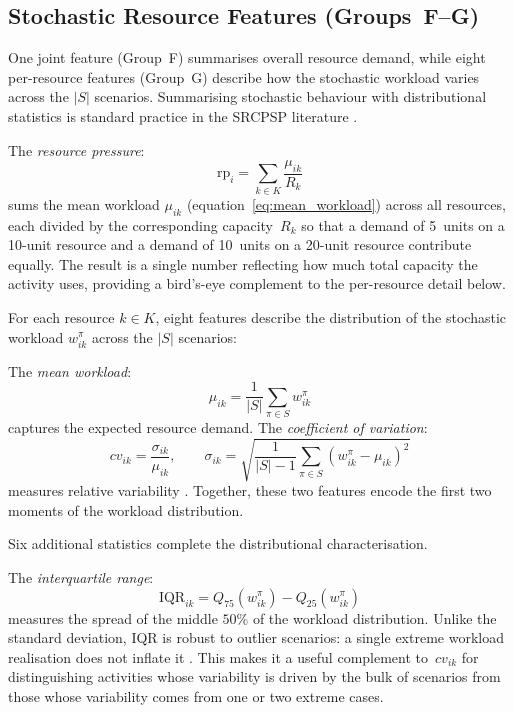 \subsection{Stochastic Resource Features (Groups~F--G)}
\label{subsec:stoch_features}
One joint feature (Group~F) summarises overall resource
demand, while eight per-resource features (Group~G) describe
how the stochastic workload varies across the $|S|$ scenarios.
Summarising stochastic behaviour with distributional statistics
is standard practice in the SRCPSP literature
\parencite{Herroelen2005, Lamas2016}.

The \textit{resource pressure}:
\begin{equation}
    \mathrm{rp}_i = \sum_{k \in K}
    \frac{\mu_{ik}}{R_k}
    \label{eq:resource_pressure}
\end{equation}
sums the mean workload $\mu_{ik}$
(equation~\ref{eq:mean_workload}) across all resources, each
divided by the corresponding capacity~$R_k$ so that a demand of
5~units on a 10-unit resource and a demand of 10~units on a
20-unit resource contribute equally. The result is a single
number reflecting how much total capacity the activity uses,
providing a bird's-eye complement to the per-resource detail
below.

For each resource $k \in K$, eight features describe the
distribution of the stochastic workload $w_{ik}^{\pi}$ across
the $|S|$ scenarios:

The \textit{mean workload}:
\begin{equation}
    \mu_{ik} = \frac{1}{|S|} \sum_{\pi \in S} w_{ik}^{\pi}
    \label{eq:mean_workload}
\end{equation}
captures the expected resource demand. The \textit{coefficient
of variation}:
\begin{equation}
    cv_{ik} = \frac{\sigma_{ik}}{\mu_{ik}},
    \qquad
    \sigma_{ik} = \sqrt{\frac{1}{|S|-1}
    \sum_{\pi \in S}(w_{ik}^{\pi} - \mu_{ik})^2}
    \label{eq:cv}
\end{equation}
measures relative variability \parencite{brown1998coefficient}.
Together, these two features encode the first two moments of
the workload distribution.

Six additional statistics complete the distributional
characterisation.

The \textit{interquartile range}:
\begin{equation}
    \mathrm{IQR}_{ik} = Q_{75}(w_{ik}^{\pi}) - Q_{25}(w_{ik}^{\pi})
    \label{eq:iqr}
\end{equation}
measures the spread of the middle $50\%$ of the workload
distribution. Unlike the standard deviation, IQR is robust to
outlier scenarios: a single extreme workload realisation does
not inflate it \parencite{Tukey1977}. This makes it a useful
complement to~$cv_{ik}$ for distinguishing activities whose
variability is driven by the bulk of scenarios from those whose
variability comes from one or two extreme cases.

